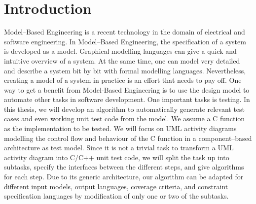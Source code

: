 \chapter{Introduction}
Model--Based Engineering is a recent technology in the domain of electrical and software engineering. In Model--Based Engineering, the specification of a system is developed as a model.
Graphical modelling languages can give a quick and intuitive overview of a system. At the same time, one can model very detailed and describe a system bit by bit with formal modelling languages.
Nevertheless, creating a model of a system in practice is an effort that needs to pay off.
One way to get a benefit from Model-Based Engineering is to use the design model to automate other tasks in software development. One important tasks is testing. 
In this thesis, we will develop an algorithm to automatically generate relevant test cases and even working unit test code from the model. We assume a C function as the implementation to be tested. We will focus on UML activity diagrams modelling the control flow and behaviour of the C function in a component--based architecture as test model. Since it is not a trivial task to transform a UML activity diagram into C/C++ unit test code, we will split the task up into subtasks, specify the interfaces between the different steps, and give algorithms for each step. Due to its generic architecture, our algorithm can be adapted for different input models, output languages, coverage criteria, and constraint specification languages by modification of only one or two of the subtasks.
